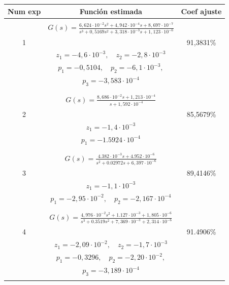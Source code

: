 \begin{longtable}{| c | c | c |}
\hline
\textbf{Num exp} & \textbf{Función estimada} & \textbf{Coef ajuste} \\
\hline 
     &  &   \\
     &  \Large$ G(s) = \frac{6,624 \cdot 10^{-2}s^{2}+ 4,942 \cdot 10^{-4}s + 8,697 \cdot 10^{-7}}{ s^{3} + 0,5169 s^{2} + 3,318 \cdot 10^{-3}s + 1,123 \cdot 10^{-6}} $ &  \\
  1 &  & 91,3831\%  \\
     &  $ z_{1} = -4,6 \cdot 10^{-3},\quad z_{2} = -2,8 \cdot 10^{-3} $ &   \\
     &  $ p_{1} = -0,5104,\quad p_{2} = -6,1 \cdot 10^{-3},$ &  \\
     &  $ p_{3} = -3,583 \cdot 10^{-4}$ &   \\
     &  & \\
\hline
     &  &   \\
     &  \Large$ G(s) = \frac{8,686 \cdot 10^{-2}s+ 1,213 \cdot 10^{-4}}{ s + 1,592\cdot 10^{-4}} $ & \\
  2 &  & 85,5679\% \\
     &  $ z_{1} = -1,4 \cdot 10^{-3} $ &   \\
     &  $ p_{1} = -1.5924\cdot10^{-4} $ &  \\
     &  &   \\
\hline
     &  &   \\
     & \Large $ G(s) = \frac{4.382 \cdot 10^{-3}s+ 4.952\cdot 10^{-6}}{ s^{2} + 0.02972s + 6,397\cdot 10^{-6}} $ &  \\
  3 &  & 89,4146\%  \\
     &  $ z_{1} = -1,1 \cdot 10^{-3} $ &   \\
     &  $ p_{1} = -2,95 \cdot 10^{-2},\quad p_{2} = -2,167 \cdot 10^{-4} $ &  \\
     &  &   \\
\hline
     &  &   \\
     & \Large $ G(s) = \frac{4,976 \cdot 10^{-2}s^{2}+ 1.127 \cdot 10^{-3} + 1,805 \cdot 10^{-6}}{ s^{3} + 0.3519s^{2} + 7,369\cdot 10^{-3} + 2,314 \cdot 10^{-6}} $ \\
  4 &  & 91.4906\%   \\
     &  $ z_{1} = -2,09 \cdot 10^{-2},\quad z_{2} = -1,7 \cdot 10^{-3} $ &   \\
     &  $ p_{1} = -0,3296,\quad p_{2} = -2,20 \cdot 10^{-2},$ &  \\
     &  $ p_{3} = -3,189 \cdot 10^{-4} $ & \\
     &  &   \\

\end{longtable}
